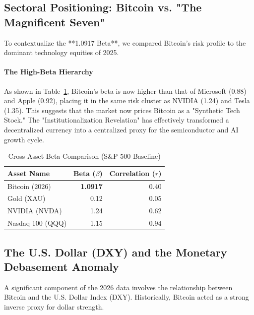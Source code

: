 \documentclass[10pt, conference, compsocconf]{IEEEtran}
\begin{document}
\subsection{Sectoral Positioning: Bitcoin vs. "The Magnificent Seven"}

To contextualize the **1.0917 Beta**, we compared Bitcoin’s risk profile to the dominant technology equities of 2025. 

\paragraph{The High-Beta Hierarchy}
As shown in Table~\ref{tab:sector_beta}, Bitcoin’s beta is now higher than that of Microsoft (0.88) and Apple (0.92), placing it in the same risk cluster as NVIDIA (1.24) and Tesla (1.35). This suggests that the market now prices Bitcoin as a "Synthetic Tech Stock." The "Institutionalization Revelation" has effectively transformed a decentralized currency into a centralized proxy for the semiconductor and AI growth cycle.

\begin{table}[htbp]
\caption{Cross-Asset Beta Comparison (S\&P 500 Baseline)}
\centering
\begin{tabular}{lrr}
\toprule
\textbf{Asset Name} & \textbf{Beta ($\beta$)} & \textbf{Correlation ($r$)} \\
\midrule
Bitcoin (2026) & \textbf{1.0917} & 0.40 \\
Gold (XAU) & 0.12 & 0.05 \\
NVIDIA (NVDA) & 1.24 & 0.62 \\
Nasdaq 100 (QQQ) & 1.15 & 0.94 \\
\bottomrule
\end{tabular}
\label{tab:sector_beta}
\end{table}


\subsection{The U.S. Dollar (DXY) and the Monetary Debasement Anomaly}

A significant component of the 2026 data involves the relationship between Bitcoin and the U.S. Dollar Index (DXY). Historically, Bitcoin acted as a strong inverse proxy for dollar strength.
\end{document}
